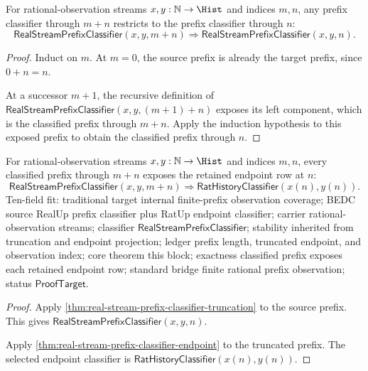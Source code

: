 \begin{theorem}
\label{thm:real-stream-prefix-classifier-truncation}
For rational-observation streams $x,y:\mathbb{N}\to\Hist$ and indices $m,n$,
any prefix classifier through $m+n$ restricts to the prefix classifier through
$n$:
$$
\mathsf{RealStreamPrefixClassifier}(x,y,m+n)
\Longrightarrow
\mathsf{RealStreamPrefixClassifier}(x,y,n).
$$
\end{theorem}
\begin{proof}
Induct on $m$. At $m=0$, the source prefix is already the target prefix, since
$0+n=n$.

At a successor $m+1$, the recursive definition of
$\mathsf{RealStreamPrefixClassifier}(x,y,(m+1)+n)$ exposes its left component,
which is the classified prefix through $m+n$. Apply the induction hypothesis to
this exposed prefix to obtain the classified prefix through $n$.
\end{proof}

\begin{theorem}
\label{thm:real-stream-prefix-internal-endpoint-coverage}
For rational-observation streams $x,y:\mathbb{N}\to\Hist$ and indices $m,n$,
every classified prefix through $m+n$ exposes the retained endpoint row at
$n$:
$$
\mathsf{RealStreamPrefixClassifier}(x,y,m+n)
\Longrightarrow
\mathsf{RatHistoryClassifier}(x(n),y(n)).
$$
Ten-field fit: traditional target internal finite-prefix observation coverage;
BEDC source RealUp prefix classifier plus RatUp endpoint classifier; carrier
rational-observation streams; classifier
$\mathsf{RealStreamPrefixClassifier}$; stability inherited from truncation and
endpoint projection; ledger prefix length, truncated endpoint, and observation
index; core theorem this block; exactness classified prefix exposes each
retained endpoint row; standard bridge finite rational prefix observation;
status $\mathsf{ProofTarget}$.
\end{theorem}
\begin{proof}
Apply \autoref{thm:real-stream-prefix-classifier-truncation} to the source
prefix. This gives $\mathsf{RealStreamPrefixClassifier}(x,y,n)$.

Apply \autoref{thm:real-stream-prefix-classifier-endpoint} to the truncated
prefix. The selected endpoint classifier is
$\mathsf{RatHistoryClassifier}(x(n),y(n))$.
\end{proof}

